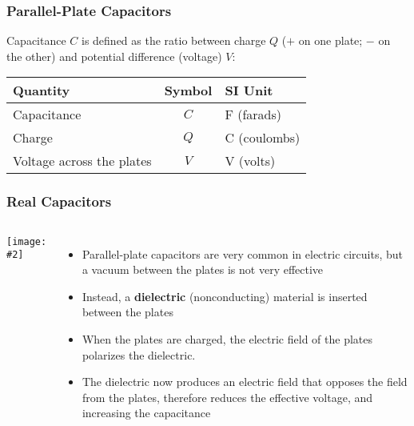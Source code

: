 \documentclass[12pt,aspectratio=169]{beamer}
\newcommand{\pic}[2]{\texttt{[image: \#2]}}
\newcommand{\eq}[2]{\vspace{#1}{\Large\begin{displaymath}#2\end{displaymath}}}
\begin{document}
\begin{frame}
  \frametitle{Parallel-Plate Capacitors}

  Capacitance $C$ is defined as the ratio between charge $Q$ ($+$ on one
  plate; $-$ on the other) and potential difference (voltage) $V$:
  
  \eq{-.05in}{
    \boxed{C=\frac{Q}{V}}
  }
  
  \begin{center}
    \begin{tabular}{l|c|l}
      \rowcolor{pink}
      \textbf{Quantity} & \textbf{Symbol} & \textbf{SI Unit} \\ \hline
      Capacitance   & $C$   & \si{\farad} (farads)\\
      Charge        & $Q$   & \si{\coulomb} (coulombs)\\
      Voltage across the plates & $V$ & \si{\volt} (volts)
    \end{tabular}
  \end{center}

\end{frame}

\begin{frame}
  \frametitle{Real Capacitors}
  \begin{columns}
    \pic{1.2}{Figure_20_05_05a.jpg}
    \begin{itemize}
    \item Parallel-plate capacitors are very common in electric circuits,
      but a vacuum between the plates is not very effective
    \item Instead, a \textbf{dielectric} (nonconducting) material is inserted
      between the plates
    \item When the plates are charged, the electric field of the plates
      polarizes the dielectric.
    \item The dielectric now produces an electric field that opposes the field
      from the plates, therefore reduces the effective voltage, and increasing
      the capacitance
    \end{itemize}
  \end{columns}
\end{frame}
\end{document}

